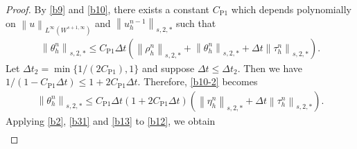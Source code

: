 \documentclass[10pt,a4paper]{amsart}
\def\norm#1#2{\left\|#2\right\|_{#1}}
\begin{document}
\begin{proof}
  By \eqref{b9} and \eqref{b10}, there exists a constant $ C_{\mathrm{P}1} $ which depends polynomially on $ \norm{L^\infty (W^{s + 1, \infty})}{u} $ and $ \norm{s, 2, \ast}{u_h^{n-1}} $ such that 
  \begin{align}
    \norm{s, 2, \ast}{\theta_h^n} \leq C_{\mathrm{P}1} \Delta t \left(\norm{s, 2, \ast}{\rho_h^n} + \norm{s, 2, \ast}{\theta_h^n} + \Delta t \norm{s, 2, \ast}{\tau_h^n}\right). 
    \label{b10-2}
  \end{align}
  Let $ \Delta t_2 = \min \{1/(2 C_{\mathrm{P}1}), 1\} $ and suppose $ \Delta t \leq \Delta t_2 $. 
  Then we have $ 1 / (1 - C_{\mathrm{P}1} \Delta t) \leq 1 + 2 C_{\mathrm{P}1} \Delta t $. 
  Therefore, \eqref{b10-2} becomes 
  \begin{align}
    \norm{s, 2, \ast}{\theta_h^n} \leq C_{\mathrm{P}1} \Delta t (1 + 2 C_{\mathrm{P}1} \Delta t) \left(\norm{s, 2, \ast}{\eta_h^n} + \Delta t \norm{s, 2, \ast}{\tau_h^n}\right). 
    \label{b13}
  \end{align}
  Applying \eqref{b2}, \eqref{b31} and \eqref{b13} to \eqref{b12}, we obtain 
  \begin{align} 

\end{align}
\end{proof}
\end{document}
